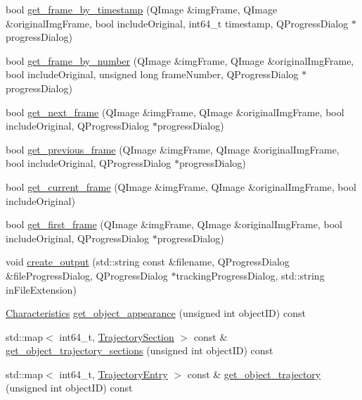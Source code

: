 \begin{DoxyCompactItemize}
\item 
bool \hyperlink{classVideoTracker_a5c146358a49c5c0d7d6e2ff2029b1bfb}{get\+\_\+frame\+\_\+by\+\_\+timestamp} (Q\+Image \&img\+Frame, Q\+Image \&original\+Img\+Frame, bool include\+Original, int64\+\_\+t timestamp, Q\+Progress\+Dialog $\ast$progress\+Dialog)
\item 
bool \hyperlink{classVideoTracker_a6d0260650063aa10284d1645bbbee778}{get\+\_\+frame\+\_\+by\+\_\+number} (Q\+Image \&img\+Frame, Q\+Image \&original\+Img\+Frame, bool include\+Original, unsigned long frame\+Number, Q\+Progress\+Dialog $\ast$progress\+Dialog)
\item 
bool \hyperlink{classVideoTracker_a23bd7731d886bd23007303246f1fb971}{get\+\_\+next\+\_\+frame} (Q\+Image \&img\+Frame, Q\+Image \&original\+Img\+Frame, bool include\+Original, Q\+Progress\+Dialog $\ast$progress\+Dialog)
\item 
bool \hyperlink{classVideoTracker_ab3f64c39d4550baeb2ef0c4020895761}{get\+\_\+previous\+\_\+frame} (Q\+Image \&img\+Frame, Q\+Image \&original\+Img\+Frame, bool include\+Original, Q\+Progress\+Dialog $\ast$progress\+Dialog)
\item 
bool \hyperlink{classVideoTracker_ac1f10ef86abebc2a2b1b78519e34d14d}{get\+\_\+current\+\_\+frame} (Q\+Image \&img\+Frame, Q\+Image \&original\+Img\+Frame, bool include\+Original)
\item 
bool \hyperlink{classVideoTracker_a9cf68ec22757e2c2a9dc7a8f6b71fc6c}{get\+\_\+first\+\_\+frame} (Q\+Image \&img\+Frame, Q\+Image \&original\+Img\+Frame, bool include\+Original, Q\+Progress\+Dialog $\ast$progress\+Dialog)
\item 
void \hyperlink{classVideoTracker_a155ecb70409e4f4e4670cbe7e5e0e0cd}{create\+\_\+output} (std\+::string const \&filename, Q\+Progress\+Dialog \&file\+Progress\+Dialog, Q\+Progress\+Dialog $\ast$tracking\+Progress\+Dialog, std\+::string in\+File\+Extension)
\item 
\hyperlink{structCharacteristics}{Characteristics} \hyperlink{classVideoTracker_a07349e6584efc93fc2fb480fe6a436b8}{get\+\_\+object\+\_\+appearance} (unsigned int object\+I\+D) const 
\item 
std\+::map$<$ int64\+\_\+t, \hyperlink{structTrajectorySection}{Trajectory\+Section} $>$ const \& \hyperlink{classVideoTracker_aa81777a4dd7aca72a994f883a9ae50e5}{get\+\_\+object\+\_\+trajectory\+\_\+sections} (unsigned int object\+I\+D) const 
\item 
std\+::map$<$ int64\+\_\+t, \hyperlink{structTrajectoryEntry}{Trajectory\+Entry} $>$ const \& \hyperlink{classVideoTracker_a1c65db5d8e998ab3525eb492bf04c171}{get\+\_\+object\+\_\+trajectory} (unsigned int object\+I\+D) const 

\end{DoxyCompactItemize}

